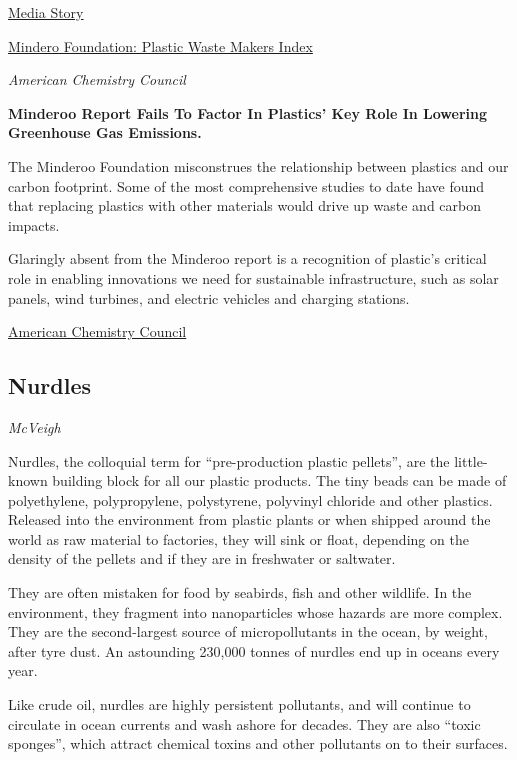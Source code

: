 \documentclass[
]{book}
\begin{document}
\href{https://sourceofplasticwaste.org/}{Media Story}

\href{https://www.minderoo.org/plastic-waste-makers-index/findings/executive-summary/}{Mindero Foundation: Plastic Waste Makers Index}

\emph{American Chemistry Council}

\textbf{Minderoo Report Fails To Factor In Plastics' Key Role In Lowering Greenhouse Gas Emissions.}

The Minderoo Foundation misconstrues the relationship between plastics and our carbon footprint. Some of the most comprehensive studies to date have found that replacing plastics with other materials would drive up waste and carbon impacts.

Glaringly absent from the Minderoo report is a recognition of plastic's critical role in enabling innovations we need for sustainable infrastructure, such as solar panels, wind turbines, and electric vehicles and charging stations.

\href{https://www.prnewswire.com/news-releases/misleading-minderoo-report-fails-to-factor-in-plastics-key-role-in-lowering-greenhouse-gas-emissions-301293161.html}{American Chemistry Council}

\hypertarget{nurdles}{%
\subsection{Nurdles}\label{nurdles}}

\emph{McVeigh}

Nurdles, the colloquial term for ``pre-production plastic pellets'', are the little-known building block for all our plastic products. The tiny beads can be made of polyethylene, polypropylene, polystyrene, polyvinyl chloride and other plastics. Released into the environment from plastic plants or when shipped around the world as raw material to factories, they will sink or float, depending on the density of the pellets and if they are in freshwater or saltwater.

They are often mistaken for food by seabirds, fish and other wildlife. In the environment, they fragment into nanoparticles whose hazards are more complex. They are the second-largest source of micropollutants in the ocean, by weight, after tyre dust. An astounding 230,000 tonnes of nurdles end up in oceans every year.

Like crude oil, nurdles are highly persistent pollutants, and will continue to circulate in ocean currents and wash ashore for decades. They are also ``toxic sponges'', which attract chemical toxins and other pollutants on to their surfaces.
\end{document}
